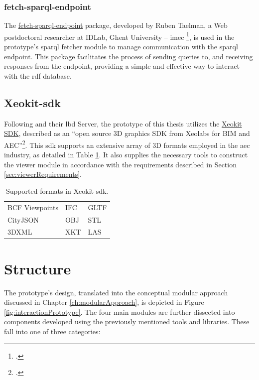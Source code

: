 \subsubsection{fetch-sparql-endpoint}
The \href{https://github.com/rubensworks/fetch-sparql-endpoint.js}{fetch-sparql-endpoint} package, developed by Ruben Taelman, a Web postdoctoral researcher at IDLab, Ghent University – imec \footcite{RubenTaelman}, is used in the prototype's \ac{sparql} fetcher module to manage communication with the \ac{sparql} endpoint. This package facilitates the process of sending queries to, and receiving responses from the endpoint, providing a simple and effective way to interact with the \ac{rdf} database.

\subsection{Xeokit-\acs{sdk}}
Following \cite{Malcolm2021} and their \ac{lbd} Server, the prototype of this thesis utilizes the \href{http://xeokit.io/index.html}{Xeokit SDK}, described as an \enquote{open source 3D graphics SDK from Xeolabs for BIM and AEC}\footcite{xeokit}. This \ac{sdk} supports an extensive array of 3D formats employed in the \ac{aec} industry, as detailed in Table \ref{tab:xeokitFormats}. It also supplies the necessary tools to construct the viewer module in accordance with the requirements described in Section \ref{sec:viewerRequirements}.

\begin{table}[H]
    \centering
    \begin{tabular}{lll}
        \toprule
        BCF Viewpoints & IFC & GLTF \\
        CityJSON       & OBJ & STL  \\
        3DXML          & XKT & LAS  \\
        \bottomrule
    \end{tabular}
    \caption[Supported formats in Xeokit \acs{sdk}]{Supported formats in Xeokit \acs{sdk}.\footnotemark}
    \label{tab:xeokitFormats}
\end{table}

\section{Structure}
The prototype's design, translated into the conceptual modular approach discussed in Chapter \ref{ch:modularApproach}, is depicted in Figure \ref{fig:interactionPrototype}. The four main modules are further dissected into components developed using the previously mentioned tools and libraries. These fall into one of three categories:


